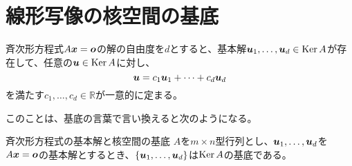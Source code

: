 \documentclass[../../../topic_linear-algebra]{subfiles}
\begin{document}
\sectionline
\section{線形写像の核空間の基底}

斉次形方程式$A\vb*{x} = \vb*{o}$の解の自由度を$d$とすると、基本解$\vb*{u}_1, \dots, \vb*{u}_d \in \operatorname{Ker} A$が存在して、任意の$\vb*{u} \in \operatorname{Ker} A$に対し、
\begin{equation*}
  \vb*{u} = c_1 \vb*{u}_1 + \cdots + c_d \vb*{u}_d
\end{equation*}
を満たす$c_1, \dots, c_d \in \mathbb{R}$が一意的に定まる。

\br

このことは、基底の言葉で言い換えると次のようになる。

\begin{theorem}{斉次形方程式の基本解と核空間の基底}
  $A$を$m \times n$型行列とし、$\vb*{u}_1, \dots, \vb*{u}_d$を$A\vb*{x} = \vb*{o}$の基本解とするとき、$\{ \vb*{u}_1, \dots, \vb*{u}_d \}$は$\operatorname{Ker} A$の基底である。
\end{theorem}
\end{document}
